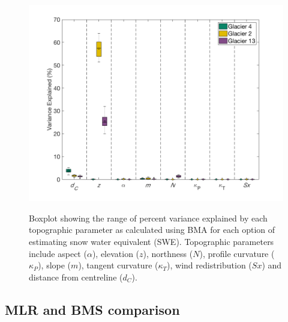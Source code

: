 \documentclass[12pt]{article}
\begin{document}
\begin{figure}[H]
	\centering
	\includegraphics[width =1.1 \textwidth]{BMSCoeffs_DensityOpts.png}\\
	\caption{Boxplot showing the range of percent variance explained by each topographic parameter as calculated using BMA for each option of estimating snow water equivalent (SWE). Topographic parameters include aspect ($\alpha$), elevation ($z$), northness ($N$), profile curvature ($\kappa_P$), slope ($m$), tangent curvature ($\kappa_T$), wind redistribution ($Sx$) and distance from centreline ($d_C$).}
	\label{fig:BMSPercentVar_densityOptions}
\end{figure} 



\subsection{MLR and BMS comparison}


\end{document}
